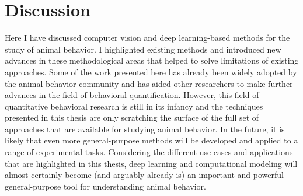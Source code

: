 \chapter*{Discussion}
Here I have discussed computer vision and deep learning-based methods for the study of animal behavior. I highlighted existing methods and introduced new advances in these methodological areas that helped to solve limitations of existing approaches. Some of the work presented here has already been widely adopted by the animal behavior community and has aided other researchers to make further advances in the field of behavioral quantification. However, this field of quantitative behavioral research is still in its infancy and the techniques presented in this thesis are only scratching the surface of the full set of approaches that are available for studying animal behavior. In the future, it is likely that even more general-purpose methods will be developed and applied to a range of experimental tasks. Considering the different use cases and applications that are highlighted in this thesis, deep learning and computational modeling will almost certainly become (and arguably already is) an important and powerful general-purpose tool for understanding animal behavior. 

